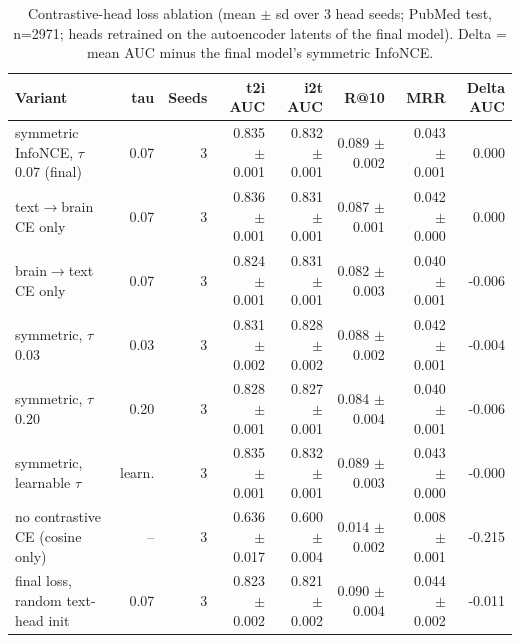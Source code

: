 \begin{table}[t]
\centering
\small
\caption{Contrastive-head loss ablation (mean $\pm$ sd over 3 head seeds; PubMed test, n=2971; heads retrained on the autoencoder latents of the final model). Delta = mean AUC minus the final model's symmetric InfoNCE.}
\label{tab:a5_loss_contrastive}
\begin{tabular}{lrrrrrrr}
\toprule
Variant & tau & Seeds & t2i AUC & i2t AUC & R@10 & MRR & Delta AUC \\
\midrule
symmetric InfoNCE, $\tau$ 0.07 (final) & 0.07 & 3 & 0.835 $\pm$ 0.001 & 0.832 $\pm$ 0.001 & 0.089 $\pm$ 0.002 & 0.043 $\pm$ 0.001 & 0.000 \\
text$\rightarrow$brain CE only & 0.07 & 3 & 0.836 $\pm$ 0.001 & 0.831 $\pm$ 0.001 & 0.087 $\pm$ 0.001 & 0.042 $\pm$ 0.000 & 0.000 \\
brain$\rightarrow$text CE only & 0.07 & 3 & 0.824 $\pm$ 0.001 & 0.831 $\pm$ 0.001 & 0.082 $\pm$ 0.003 & 0.040 $\pm$ 0.001 & -0.006 \\
symmetric, $\tau$ 0.03 & 0.03 & 3 & 0.831 $\pm$ 0.002 & 0.828 $\pm$ 0.002 & 0.088 $\pm$ 0.002 & 0.042 $\pm$ 0.001 & -0.004 \\
symmetric, $\tau$ 0.20 & 0.20 & 3 & 0.828 $\pm$ 0.001 & 0.827 $\pm$ 0.001 & 0.084 $\pm$ 0.004 & 0.040 $\pm$ 0.001 & -0.006 \\
symmetric, learnable $\tau$ & learn. & 3 & 0.835 $\pm$ 0.001 & 0.832 $\pm$ 0.001 & 0.089 $\pm$ 0.003 & 0.043 $\pm$ 0.000 & -0.000 \\
no contrastive CE (cosine only) & -- & 3 & 0.636 $\pm$ 0.017 & 0.600 $\pm$ 0.004 & 0.014 $\pm$ 0.002 & 0.008 $\pm$ 0.001 & -0.215 \\
final loss, random text-head init & 0.07 & 3 & 0.823 $\pm$ 0.002 & 0.821 $\pm$ 0.002 & 0.090 $\pm$ 0.004 & 0.044 $\pm$ 0.002 & -0.011 \\
\bottomrule
\end{tabular}
\end{table}
